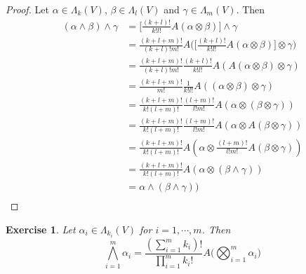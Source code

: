 \documentclass[12pt]{amsart}
\newtheorem{ex}[thm]{Exercise}
\newcommand{\al}{\alpha}
\newcommand{\gam}{\gamma}
\newcommand{\bet}{\beta}
\newcommand{\Lam}{\Lambda}
\begin{document}
	\begin{proof}
		Let $\al \in \Lam_k(V)$, $\beta \in \Lam_l(V)$ and $\gam \in \Lam_m(V)$. Then 
		\begin{align*}
			(\al \wedge \bet) \wedge \gam
			&= \bigg [ \frac{(k+l)!}{k! l!} A(\al \otimes \beta) \bigg] \wedge \gam \\ 
			&= \frac{(k+l+m)!}{(k+l)!m!} A \bigg( \bigg [ \frac{(k+l)!}{k! l!} A(\al \otimes \beta) \bigg] \otimes \gam \bigg)  \\ 
			&= \frac{(k+l+m)!}{(k+l)!m!}  \frac{(k+l)!}{k!l!}A(A(\al \otimes \bet) \otimes \gam) \\
			&= \frac{(k+l+m)!}{m!}  \frac{1}{k!l!} A((\al \otimes \beta) \otimes \gam) \\
			&= \frac{(k+l+m)!}{k!(l+m)!}  \frac{(l+m)!}{l!m!} A(\al \otimes (\bet \otimes \gam)) \\
			&= \frac{(k+l+m)!}{k!(l+m)!}  \frac{(l+m)!}{l!m!} A(\al \otimes A(\bet \otimes \gam)) \\
			&= \frac{(k+l+m)!}{k!(l+m)!} A(\al \otimes \frac{(l+m)!}{l!m!} A(\bet \otimes \gam)) \\
			&= \frac{(k+l+m)!}{k!(l+m)!} A(\al \otimes (\bet \wedge \gam)) \\
			&= \al \wedge (\bet \wedge \gam)) \\
		\end{align*}
	\end{proof}
	
	\begin{ex}
		Let $\al_i \in \Lam_{k_i}(V)$ for $i =1, \cdots, m$. Then $$\bigwedge_{i=1}^m \al_i = \frac{(\sum_{i=1}^m k_i)!}{\prod_{i=1}^m k_i!} A \bigg(\bigotimes_{i=1}^m \al_i \bigg)$$
	\end{ex}
\end{document}
